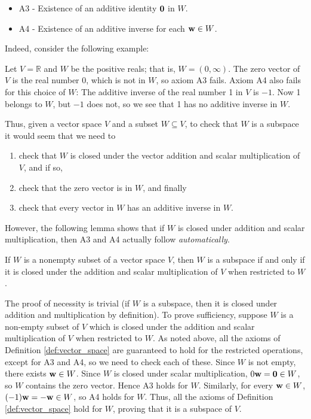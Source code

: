 \documentclass[12pt,letterpaper,reqno]{article}
\numberwithin{equation}{section}
\begin{document}
\begin{itemize}
	\item A3 - Existence of an additive identity ${\bf 0}$ in $W$.
	\item A4 - Existence of an additive inverse for each ${\bf w} \in W$.
\end{itemize}

Indeed, consider the following example:

\begin{example}
Let $V=\mathbb{R}$ and $W$ be the positive reals; that is, $W=(0,\infty)$. The zero vector of $V$ is the real number 0, which is not in $W$, so axiom A3 fails. Axiom A4 also fails for this choice of $W$: The additive inverse of the real number 1 in $V$ is $-1$. Now 1 belongs to $W$, but $-1$ does not, so we see that 1 has no additive inverse in $W$. 	
\end{example}

Thus, given a vector space $V$ and a subset $W \subseteq V$, to check that $W$ is a subspace it would seem that we need to
\begin{enumerate}
	\item check that $W$ is closed under the vector addition and scalar multiplication of $V$, and if so,
	\item check that the zero vector is in $W$, and finally
	\item check that every vector in $W$ has an additive inverse in $W$.
\end{enumerate}
However, the following lemma shows that if $W$ is closed under addition and scalar multiplication, then A3 and A4 actually follow \emph{automatically}.

\begin{lem}\label{lem:subspace_criterion}
	If $W$ is a nonempty subset of a vector space $V$, then $W$ is a subspace if and only if it is closed under the addition and scalar multiplication of $V$ when restricted to $W$.
\end{lem}

\begin{pf}
The proof of necessity is trivial (if $W$ is a subspace, then it is closed under addition and multiplication by definition). To prove sufficiency, suppose $W$ is a non-empty subset of $V$ which is closed under the addition and scalar multiplication of $V$ when restricted to $W$. As noted above, all the axioms of Definition \ref{def:vector_space} are guaranteed to hold for the restricted operations, except for A3 and A4, so we need to check each of these. Since $W$ is not empty, there exists ${\bf w} \in W$. Since $W$ is closed under scalar multiplication, $0{\bf w}={\bf 0} \in W$, so $W$ contains the zero vector. Hence A3 holds for $W$. Similarly, for every ${\bf w} \in W$, $(-1){\bf w}=-{\bf w} \in W$, so A4 holds for $W$. Thus, all the axioms of Definition \ref{def:vector_space} hold for $W$, proving that it is a subspace of $V$.	
\end{pf}
\end{document}
